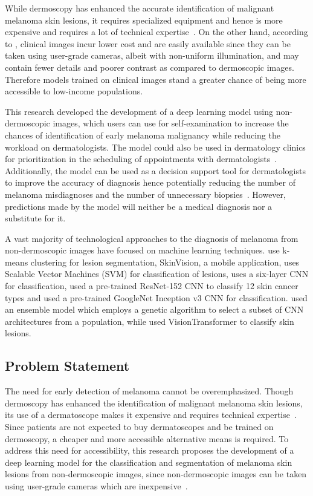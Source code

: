 \documentclass[12pt, a4paper]{article}
\begin{document}
While dermoscopy has enhanced the accurate identification of malignant melanoma skin lesions, it requires specialized equipment and hence is more expensive and requires a lot of technical expertise~\citep{jones2019dermoscopy, lee2010dermatoscopy}. On the other hand, according to \cite{jafari2017extraction}, clinical images incur lower cost and are easily available since they can be taken using user-grade cameras, albeit with non-uniform illumination, and may contain fewer details and poorer contrast as compared to dermoscopic images. Therefore models trained on clinical images stand a greater chance of being more accessible to low-income populations.

This research developed the development of a deep learning model using non-dermoscopic images, which users can use for self-examination to increase the chances of identification of early melanoma malignancy while reducing the workload on dermatologists. The model could also be used in dermatology clinics for prioritization in the scheduling of appointments with dermatologists~\citep{jafari2017extraction}. Additionally, the model can be used as a decision support tool for dermatologists to improve the accuracy of diagnosis hence potentially reducing the number of melanoma misdiagnoses and the number of unnecessary biopsies~\citep{rossi2022cost}. However, predictions made by the model will neither be a medical diagnosis nor a substitute for it.

A vast majority of technological approaches to the diagnosis of melanoma from non-dermoscopic images have focused on machine learning techniques. \cite{giotis2015med} use k-means clustering for lesion segmentation, SkinVision, a mobile application, uses Scalable Vector Machines (SVM) for classification of lesions, \cite{7590963} uses a six-layer CNN for classification, \cite{HAN20181529} used a pre-trained ResNet-152 CNN to classify 12 skin cancer types and \cite{esteva2017dermatologist} used a pre-trained GoogleNet Inception v3 CNN for classification. \cite{perez2021ensemble} used an ensemble model which employs a genetic algorithm to select a subset of CNN architectures from a population, while \cite{de2022exploring} used VisionTransformer to classify skin lesions.
\subsection{Problem Statement}
The need for early detection of melanoma cannot be overemphasized. Though dermoscopy has enhanced the identification of malignant melanoma skin lesions, its use of a dermatoscope makes it expensive and requires technical expertise~\citep{jones2019dermoscopy, lee2010dermatoscopy}. Since patients are not expected to buy dermatoscopes and be trained on dermoscopy, a cheaper and more accessible alternative means is required. To address this need for accessibility, this research proposes the development of a deep learning model for the classification and segmentation of melanoma skin lesions from non-dermoscopic images, since non-dermoscopic images can be taken using user-grade cameras which are inexpensive~\citep{jafari2017extraction}.
\end{document}
